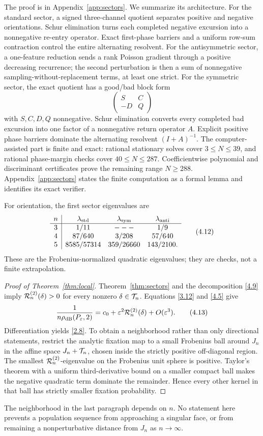 The proof is in Appendix~\ref{app:sectors}.  We summarize its architecture.
For the standard sector, a signed three-channel quotient separates positive
and negative orientations.  Schur elimination turns each completed negative
excursion into a nonnegative re-entry operator.  Exact first-phase barriers
and a uniform row-sum contraction control the entire alternating resolvent.
For the antisymmetric sector, a one-feature reduction sends a rank Poisson
gradient through a positive decreasing recurrence; the second perturbation
is then a sum of nonnegative sampling-without-replacement terms, at least one
strict.  For the symmetric sector, the exact quotient has a good/bad block form
\[
 \begin{pmatrix}S&C\\-D&Q\end{pmatrix}                     \tag{4.11}\label{4.11}
\]
with $S,C,D,Q$ nonnegative.  Schur elimination converts every completed bad
excursion into one factor of a nonnegative return operator $A$.  Explicit
positive phase barriers dominate the alternating resolvent $(I+A)^{-1}$.
The computer-assisted part is finite and exact: rational stationary solves
cover $3\le N\le39$, and rational phase-margin checks cover
$40\le N\le287$.  Coefficientwise polynomial and discriminant certificates
prove the remaining range $N\ge288$.  Appendix~\ref{app:sectors} states the
finite computation as a formal lemma and identifies its exact verifier.

For orientation, the first sector eigenvalues are
\[
\begin{array}{c|ccc}
n&\lambda_{\rm std}&\lambda_{\rm sym}&\lambda_{\rm anti}\\ \hline
3&1/11&---&1/9\\
4&87/640&3/208&57/640\\
5&8585/57314&359/26660&143/2100.
\end{array}                                                  \tag{4.12}\label{4.12}
\]
These are the Frobenius-normalized quadratic eigenvalues; they are checks,
not a finite extrapolation.

\begin{proof}[Proof of Theorem~\ref{thm:local}]
Theorem~\ref{thm:sectors} and the decomposition \eqref{4.9} imply
$\mathcal R^{(2)}_{n}(\delta)>0$ for every nonzero $\delta\in\mathcal T_n$.  Equations
\eqref{3.12} and \eqref{4.5} give
\[
 \frac1{n\rho_{\mathrm{dB}}(P_\varepsilon,2)}
 =c_0+\varepsilon^2\mathcal R^{(2)}_{n}(\delta)+O(\varepsilon^3).         \tag{4.13}\label{4.13}
\]
Differentiation yields \eqref{2.8}.  To obtain a neighborhood rather than
only directional statements, restrict the analytic fixation map to a small
Frobenius ball around $J_n$ in the affine space $J_n+\mathcal T_n$, chosen inside the
strictly positive off-diagonal region.  The smallest
$\mathcal R^{(2)}_{n}$-eigenvalue on the Frobenius unit sphere is positive.  Taylor's theorem with
a uniform third-derivative bound on a smaller compact ball makes the
negative quadratic term dominate the remainder.  Hence every other kernel
in that ball has strictly smaller fixation probability.
\end{proof}

\begin{remark}
The neighborhood in the last paragraph depends on $n$.  No statement here
prevents a population sequence from approaching a singular face, or from
remaining a nonperturbative distance from $J_n$ as $n\to\infty$.
\end{remark}
